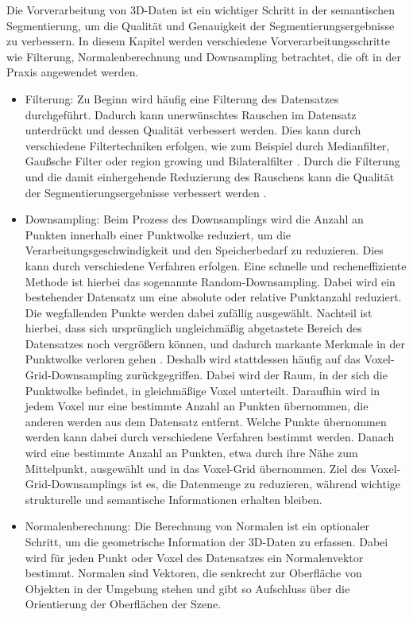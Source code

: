 Die Vorverarbeitung von 3D-Daten ist ein wichtiger Schritt in der semantischen
Segmentierung, um die Qualität und Genauigkeit der Segmentierungsergebnisse zu
verbessern. In diesem Kapitel werden verschiedene Vorverarbeitungsschritte wie
Filterung, Normalenberechnung und Downsampling betrachtet, die oft in der
Praxis angewendet werden.

\begin{itemize}

\item Filterung: Zu Beginn wird häufig eine Filterung des Datensatzes durchgeführt.
Dadurch kann unerwünschtes Rauschen im Datensatz unterdrückt und dessen
Qualität verbessert werden. Dies kann durch verschiedene Filtertechniken
erfolgen, wie zum Beispiel durch Medianfilter, Gaußsche Filter \cite{9191237}
oder region growing und Bilateralfilter \cite{6460813}. Durch die Filterung und
die damit einhergehende Reduzierung des Rauschens kann die Qualität der
Segmentierungsergebnisse verbessert werden \cite{HAN2017103}.

\item Downsampling: Beim Prozess des Downsamplings wird die Anzahl an Punkten
innerhalb einer Punktwolke reduziert, um die Verarbeitungsgeschwindigkeit und
den Speicherbedarf zu reduzieren. Dies kann durch verschiedene Verfahren
erfolgen. Eine schnelle und recheneffiziente Methode ist hierbei das
sogenannte Random-Downsampling. Dabei wird ein bestehender Datensatz um eine
absolute oder relative Punktanzahl reduziert. Die wegfallenden Punkte werden
dabei zufällig ausgewählt. Nachteil ist hierbei, dass sich ursprünglich
ungleichmäßig abgetastete Bereich des Datensatzes noch vergrößern können, und
dadurch markante Merkmale in der Punktwolke verloren gehen
\cite{987567547,2233445566}. Deshalb wird stattdessen häufig auf das
Voxel-Grid-Downsampling zurückgegriffen. Dabei wird der Raum, in der sich die
Punktwolke befindet, in gleichmäßige Voxel unterteilt. Daraufhin wird in jedem
Voxel nur eine bestimmte Anzahl an Punkten übernommen, die anderen werden aus
dem Datensatz entfernt. Welche Punkte übernommen werden kann dabei durch
verschiedene Verfahren bestimmt werden. Danach wird eine bestimmte Anzahl an
Punkten, etwa durch ihre Nähe zum Mittelpunkt, ausgewählt und in das Voxel-Grid
übernommen. Ziel des Voxel-Grid-Downsamplings ist es, die Datenmenge zu
reduzieren, während wichtige strukturelle und semantische Informationen
erhalten bleiben. %

\item Normalenberechnung: Die Berechnung von Normalen ist ein optionaler Schritt, um
die geometrische Information der 3D-Daten zu erfassen. Dabei wird für jeden
Punkt oder Voxel des Datensatzes ein Normalenvektor bestimmt. Normalen sind
Vektoren, die senkrecht zur Oberfläche von Objekten in der Umgebung stehen und
gibt so Aufschluss über die Orientierung der Oberflächen der Szene.
\cite{6375034}

\end{itemize}


